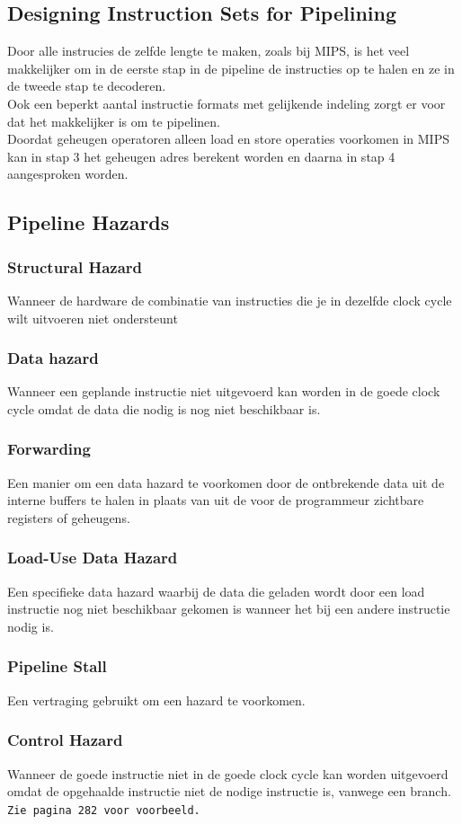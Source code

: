 	\subsection{Designing Instruction Sets for Pipelining}
	Door alle instrucies de zelfde lengte te maken, zoals bij MIPS, is het veel makkelijker om in de eerste stap in de pipeline de instructies op te halen en ze in de tweede stap te decoderen.\\
	Ook een beperkt aantal instructie formats met gelijkende indeling zorgt er voor dat het makkelijker is om te pipelinen.\\
	Doordat geheugen operatoren alleen load en store operaties voorkomen in MIPS kan in stap 3 het geheugen adres berekent worden en daarna in stap 4 aangesproken worden.
	\subsection{Pipeline Hazards}
	\subsubsection{Structural Hazard}
	Wanneer de hardware de combinatie van instructies die je in dezelfde clock cycle wilt uitvoeren niet ondersteunt
	\subsubsection{Data hazard}
	Wanneer een geplande instructie niet uitgevoerd kan worden in de goede clock cycle omdat de data die nodig is nog niet beschikbaar is.
	\subsubsection*{Forwarding}
	Een manier om een data hazard te voorkomen door de ontbrekende data uit de interne buffers te halen in plaats van uit de voor de programmeur zichtbare registers of geheugens.
	\subsubsection{Load-Use Data Hazard}
	Een specifieke data hazard waarbij de data die geladen wordt door een load instructie nog niet beschikbaar gekomen is wanneer het bij een andere instructie nodig is.
	\subsubsection*{Pipeline Stall}
	Een vertraging gebruikt om een hazard te voorkomen.
	\subsubsection{Control Hazard}
	Wanneer de goede instructie niet in de goede clock cycle kan  worden uitgevoerd omdat de opgehaalde instructie niet de nodige instructie is, vanwege een branch.\\
	\texttt{Zie pagina 282 voor voorbeeld.}
